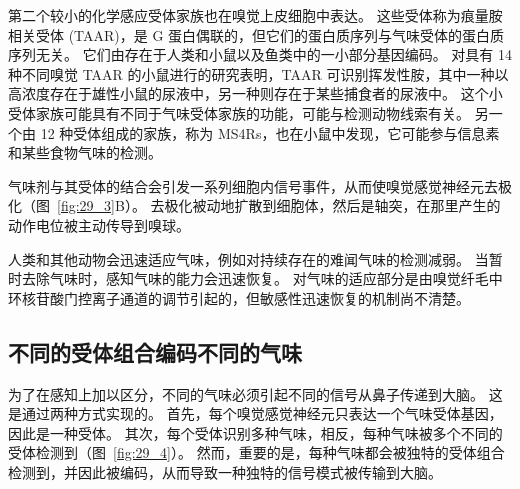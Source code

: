 第二个较小的化学感应受体家族也在嗅觉上皮细胞中表达。
这些受体称为痕量胺相关受体 (TAAR)，是 G 蛋白偶联的，但它们的蛋白质序列与气味受体的蛋白质序列无关。 
它们由存在于人类和小鼠以及鱼类中的一小部分基因编码。
对具有 14 种不同嗅觉 TAAR 的小鼠进行的研究表明，TAAR 可识别挥发性胺，其中一种以高浓度存在于雄性小鼠的尿液中，另一种则存在于某些捕食者的尿液中。
这个小受体家族可能具有不同于气味受体家族的功能，可能与检测动物线索有关。
另一个由 12 种受体组成的家族，称为 MS4Rs，也在小鼠中发现，它可能参与信息素和某些食物气味的检测。


气味剂与其受体的结合会引发一系列细胞内信号事件，从而使嗅觉感觉神经元去极化（图~\ref{fig:29_3}B）。
去极化被动地扩散到细胞体，然后是轴突，在那里产生的动作电位被主动传导到嗅球。


人类和其他动物会迅速适应气味，例如对持续存在的难闻气味的检测减弱。
当暂时去除气味时，感知气味的能力会迅速恢复。
对气味的适应部分是由嗅觉纤毛中环核苷酸门控离子通道的调节引起的，但敏感性迅速恢复的机制尚不清楚。



\subsection{不同的受体组合编码不同的气味}

为了在感知上加以区分，不同的气味必须引起不同的信号从鼻子传递到大脑。
这是通过两种方式实现的。
首先，每个嗅觉感觉神经元只表达一个气味受体基因，因此是一种受体。 
其次，每个受体识别多种气味，相反，每种气味被多个不同的受体检测到（图~\ref{fig:29_4}）。 
然而，重要的是，每种气味都会被独特的受体组合检测到，并因此被编码，从而导致一种独特的信号模式被传输到大脑。


